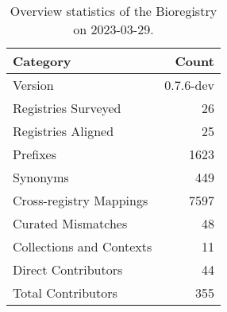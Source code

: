 \begin{table}
\centering
\caption{Overview statistics of the Bioregistry on 2023-03-29.}
\label{tab:bioregistry-summary}
\begin{tabular}{lr}
\toprule
                Category &     Count \\
\midrule
                 Version & 0.7.6-dev \\
     Registries Surveyed &        26 \\
      Registries Aligned &        25 \\
                Prefixes &      1623 \\
                Synonyms &       449 \\
 Cross-registry Mappings &      7597 \\
      Curated Mismatches &        48 \\
Collections and Contexts &        11 \\
     Direct Contributors &        44 \\
      Total Contributors &       355 \\
\bottomrule
\end{tabular}
\end{table}
